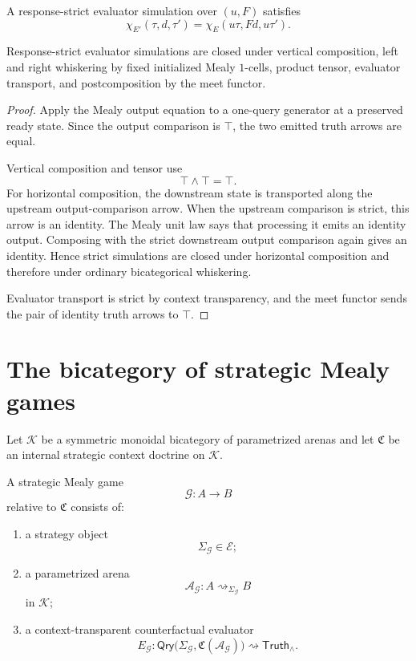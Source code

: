 \begin{proposition}
\label{prop:classifier-preservation}
A response-strict evaluator simulation over \((u,F)\) satisfies
\[
  \chi_{E'}(\tau,d,\tau')
  =
  \chi_E(u\tau,Fd,u\tau').
\]

Response-strict evaluator simulations are closed under vertical composition, left and right
whiskering by fixed initialized Mealy \(1\)-cells, product tensor, evaluator transport, and
postcomposition by the meet functor.
\end{proposition}

\begin{proof}
Apply the Mealy output equation to a one-query generator at a preserved ready state. Since the output
comparison is \(\top\), the two emitted truth arrows are equal.

Vertical composition and tensor use
\[
  \top\wedge\top=\top.
\]
For horizontal composition, the downstream state is transported along the upstream
output-comparison arrow. When the upstream comparison is strict, this arrow is an identity. The
Mealy unit law says that processing it emits an identity output. Composing with the strict
downstream output comparison again gives an identity. Hence strict simulations are closed under
horizontal composition and therefore under ordinary bicategorical whiskering.

Evaluator transport is strict by context transparency, and the meet functor sends the pair of
identity truth arrows to \(\top\).
\end{proof}

\section{The bicategory of strategic Mealy games}
\label{sec:strategic-mealy-games}

Let \(\mathcal K\) be a symmetric monoidal bicategory of parametrized arenas and let
\(\mathfrak C\) be an internal strategic context doctrine on \(\mathcal K\).

\begin{definition}
\label{def:strategic-mealy-game}
A strategic Mealy game
\[
  \mathcal G:A\longrightarrow B
\]
relative to \(\mathfrak C\) consists of:
\begin{enumerate}
  \item a strategy object
  \[
    \Sigma_{\mathcal G}\in\mathcal E;
  \]
  \item a parametrized arena
  \[
    \mathcal A_{\mathcal G}:
    A\rightsquigarrow_{\Sigma_{\mathcal G}}B
  \]
  in \(\mathcal K\);
  \item a context-transparent counterfactual evaluator
  \[
    E_{\mathcal G}:
    \mathsf{Qry}
    \bigl(
      \Sigma_{\mathcal G},
      \mathfrak C(\mathcal A_{\mathcal G})
    \bigr)
    \rightsquigarrow
    \mathsf{Truth}_\wedge.
  \]
\end{enumerate}
\end{definition}

